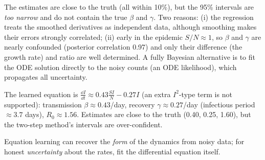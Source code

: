 \documentclass[11pt]{article}
\begin{document}
\begin{sanity}
The estimates are close to the truth (all within 10\%), but the 95\% intervals are \emph{too narrow} and do not contain the true $\beta$ and $\gamma$. Two reasons: (i) the regression treats the smoothed derivatives as independent data, although smoothing makes their errors strongly correlated; (ii) early in the epidemic $S/N\approx1$, so $\beta$ and $\gamma$ are nearly confounded (posterior correlation 0.97) and only their difference (the growth rate) and ratio are well determined. A fully Bayesian alternative is to fit the ODE solution directly to the noisy counts (an ODE likelihood), which propagates all uncertainty.
\end{sanity}

\begin{answer}
The learned equation is $\frac{\dd I}{\dd t}\approx0.43\frac{SI}{N}-0.27I$ (an extra $I^2$-type term is not supported): transmission $\beta\approx0.43$/day, recovery $\gamma\approx0.27$/day (infectious period $\approx3.7$ days), $R_0\approx1.56$. Estimates are close to the truth (0.40, 0.25, 1.60), but the two-step method's intervals are over-confident.
\end{answer}

\begin{takeaway}
Equation learning can recover the \emph{form} of the dynamics from noisy data; for honest \emph{uncertainty} about the rates, fit the differential equation itself.
\end{takeaway}
\end{document}
